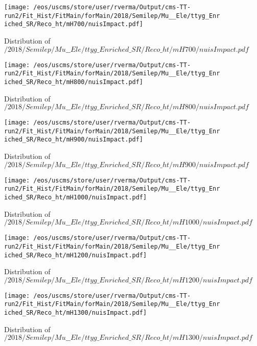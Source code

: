 \begin{figure}
\centering
\texttt{[image: /eos/uscms/store/user/rverma/Output/cms-TT-run2/Fit\_Hist/FitMain/forMain/2018/Semilep/Mu\_\_Ele/ttyg\_Enriched\_SR/Reco\_ht/mH700/nuisImpact.pdf]}
\caption{Distribution of $/2018/Semilep/Mu\_\_Ele/ttyg\_Enriched\_SR/Reco\_ht/mH700/nuisImpact.pdf$}
\end{figure}

\begin{figure}
\centering
\texttt{[image: /eos/uscms/store/user/rverma/Output/cms-TT-run2/Fit\_Hist/FitMain/forMain/2018/Semilep/Mu\_\_Ele/ttyg\_Enriched\_SR/Reco\_ht/mH800/nuisImpact.pdf]}
\caption{Distribution of $/2018/Semilep/Mu\_\_Ele/ttyg\_Enriched\_SR/Reco\_ht/mH800/nuisImpact.pdf$}
\end{figure}

\begin{figure}
\centering
\texttt{[image: /eos/uscms/store/user/rverma/Output/cms-TT-run2/Fit\_Hist/FitMain/forMain/2018/Semilep/Mu\_\_Ele/ttyg\_Enriched\_SR/Reco\_ht/mH900/nuisImpact.pdf]}
\caption{Distribution of $/2018/Semilep/Mu\_\_Ele/ttyg\_Enriched\_SR/Reco\_ht/mH900/nuisImpact.pdf$}
\end{figure}

\begin{figure}
\centering
\texttt{[image: /eos/uscms/store/user/rverma/Output/cms-TT-run2/Fit\_Hist/FitMain/forMain/2018/Semilep/Mu\_\_Ele/ttyg\_Enriched\_SR/Reco\_ht/mH1000/nuisImpact.pdf]}
\caption{Distribution of $/2018/Semilep/Mu\_\_Ele/ttyg\_Enriched\_SR/Reco\_ht/mH1000/nuisImpact.pdf$}
\end{figure}

\begin{figure}
\centering
\texttt{[image: /eos/uscms/store/user/rverma/Output/cms-TT-run2/Fit\_Hist/FitMain/forMain/2018/Semilep/Mu\_\_Ele/ttyg\_Enriched\_SR/Reco\_ht/mH1200/nuisImpact.pdf]}
\caption{Distribution of $/2018/Semilep/Mu\_\_Ele/ttyg\_Enriched\_SR/Reco\_ht/mH1200/nuisImpact.pdf$}
\end{figure}

\begin{figure}
\centering
\texttt{[image: /eos/uscms/store/user/rverma/Output/cms-TT-run2/Fit\_Hist/FitMain/forMain/2018/Semilep/Mu\_\_Ele/ttyg\_Enriched\_SR/Reco\_ht/mH1300/nuisImpact.pdf]}
\caption{Distribution of $/2018/Semilep/Mu\_\_Ele/ttyg\_Enriched\_SR/Reco\_ht/mH1300/nuisImpact.pdf$}
\end{figure}

